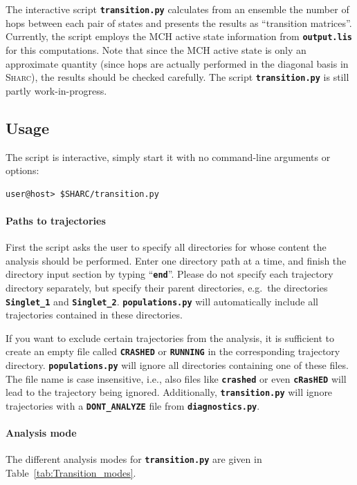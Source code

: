 \documentclass[a4paper,10pt,DIV=15,openany]{scrbook}
\newcommand{\ttt}[1]{\textbf{\texttt{#1}}}
\begin{document}
The interactive script \ttt{transition.py} calculates from an ensemble the number of hops between each pair of states and presents the results as ``transition matrices''.
Currently, the script employs the MCH active state information from \ttt{output.lis} for this computations. 
Note that since the MCH active state is only an approximate quantity (since hops are actually performed in the diagonal basis in \textsc{Sharc}), the results should be checked carefully.
The script \ttt{transition.py} is still partly work-in-progress.

\subsection{Usage}

The script is interactive, simply start it with no command-line arguments or options:
\begin{verbatim}
user@host> $SHARC/transition.py
\end{verbatim}

\paragraph{Paths to trajectories}

First the script asks the user to specify all directories for whose content the analysis should be performed. Enter one directory path at a time, and finish the directory input section by typing ``\ttt{end}''. Please do not specify each trajectory directory separately, but specify their parent directories, e.g.\ the directories \ttt{Singlet\_1} and \ttt{Singlet\_2}. \ttt{populations.py} will automatically include all trajectories contained in these directories.

If you want to exclude certain trajectories from the analysis, it is sufficient to create an empty file called \ttt{CRASHED} or \ttt{RUNNING} in the corresponding trajectory directory. \ttt{populations.py} will ignore all directories containing one of these files. The file name is case insensitive, i.e., also files like \ttt{crashed} or even \ttt{cRasHED} will lead to the trajectory being ignored.
Additionally, \ttt{transition.py} will ignore trajectories with a \ttt{DONT\_ANALYZE} file from \ttt{diagnostics.py}.

\paragraph{Analysis mode}

The different analysis modes for \ttt{transition.py} are given in Table~\ref{tab:Transition_modes}.
\end{document}
